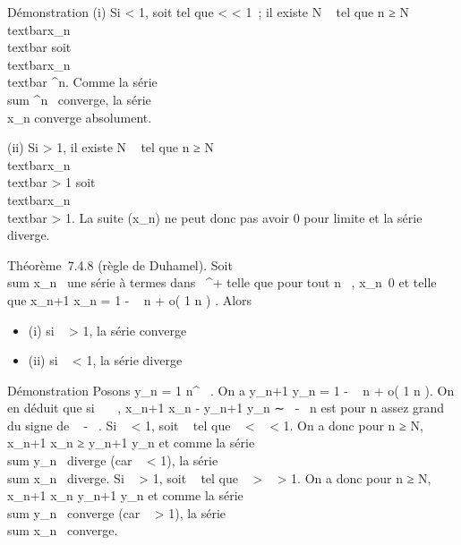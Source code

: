 \documentclass[]{article}
\begin{document}
Démonstration (i) Si \ell \textless{} 1, soit \rho tel que \ell \textless{} \rho
\textless{} 1~; il existe N \in {}~ tel que n ≥ N
\rigtharrow~\rootn\of\\textbar{}x\_n\\textbar{}
\leq \rho soit
\\textbar{}x\_n\\textbar{} \leq
\rho^n. Comme la série
\\sum  \rho^n~
converge, la série \\\sum
 x\_n converge absolument.

(ii) Si \ell \textgreater{} 1, il existe N \in {}~ tel que n ≥ N
\rigtharrow~\rootn\of\\textbar{}x\_n\\textbar{}
\textgreater{} 1 soit
\\textbar{}x\_n\\textbar{}
\textgreater{} 1. La suite (x\_n) ne peut donc pas avoir 0 pour
limite et la série diverge.

Théorème~7.4.8 (règle de Duhamel). Soit
\\sum  x\_n~ une
série à termes dans ~^+ telle que pour tout n \in {}~,
x\_n\neq~0 et telle que  x\_n+1
\over x\_n = 1 - \lambda~ \over n +
o( 1 \over n ) . Alors

\begin{itemize}
\itemsep1pt\parskip0pt
\item
  (i) si \lambda~ \textgreater{} 1, la série converge
\item
  (ii) si \lambda~ \textless{} 1, la série diverge
\end{itemize}

Démonstration Posons y\_n = 1 \over
n^\alpha~ . On a  y\_n+1 \over
y\_n = 1 - \alpha~ \over n + o( 1
\over n ). On en déduit que si
\alpha~\neq~\lambda~,  x\_n+1 \over
x\_n - y\_n+1 \over y\_n
∼ \alpha~-\lambda~ \over n est pour n assez grand du signe de \alpha~ -
\lambda~. Si \lambda~ \textless{} 1, soit \alpha~ tel que \lambda~ \textless{} \alpha~ \textless{} 1. On
a donc pour n ≥ N,  x\_n+1 \over x\_n
≥ y\_n+1 \over y\_n et comme la série
\\sum  y\_n~
diverge (car \alpha~ \textless{} 1), la série
\\sum  x\_n~
diverge. Si \lambda~ \textgreater{} 1, soit \alpha~ tel que \lambda~ \textgreater{} \alpha~
\textgreater{} 1. On a donc pour n ≥ N,  x\_n+1
\over x\_n \leq y\_n+1
\over y\_n et comme la série
\\sum  y\_n~
converge (car \alpha~ \textgreater{} 1), la série
\\sum  x\_n~
converge.
\end{document}
